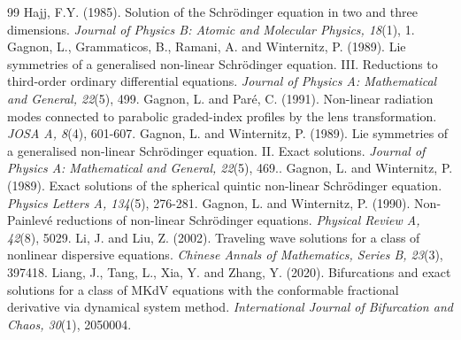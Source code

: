 \documentclass{article}
\numberwithin{equation}{section}
\begin{document}
\begin{thebibliography}{99}
Hajj, F.Y. (1985). Solution of the Schr\"{o}dinger equation in two and three dimensions. \emph{Journal of Physics B: Atomic and Molecular Physics, 18}(1), 1.
Gagnon, L., Grammaticos, B., Ramani, A. and Winternitz, P. (1989). Lie symmetries of a generalised non-linear Schr\"{o}dinger equation. III. Reductions to third-order ordinary differential equations. \emph{Journal of Physics A: Mathematical and General, 22}(5), 499.
Gagnon, L. and Paré, C. (1991). Non-linear radiation modes connected to parabolic graded-index profiles by the lens transformation. \emph{JOSA A, 8}(4), 601-607.
Gagnon, L. and Winternitz, P. (1989). Lie symmetries of a generalised non-linear Schr\"{o}dinger equation. II. Exact solutions. \emph{Journal of Physics A: Mathematical and General, 22}(5), 469..
Gagnon, L. and Winternitz, P. (1989). Exact solutions of the spherical quintic non-linear Schrödinger equation. \emph{Physics Letters A, 134}(5), 276-281.
Gagnon, L. and Winternitz, P. (1990). Non-Painlevé reductions of non-linear Schrödinger equations. \emph{Physical Review A, 42}(8), 5029.
Li, J. and Liu, Z. (2002). Traveling wave solutions for a class of nonlinear dispersive equations. \emph{Chinese Annals of Mathematics, Series B, 23}(3), 397418.
 Liang, J., Tang, L., Xia, Y. and Zhang, Y. (2020). Bifurcations and exact solutions for a class of MKdV equations with the conformable fractional derivative via dynamical system method. \emph{International Journal of Bifurcation and Chaos, 30}(1), 2050004.
\end{thebibliography}
\end{document}
